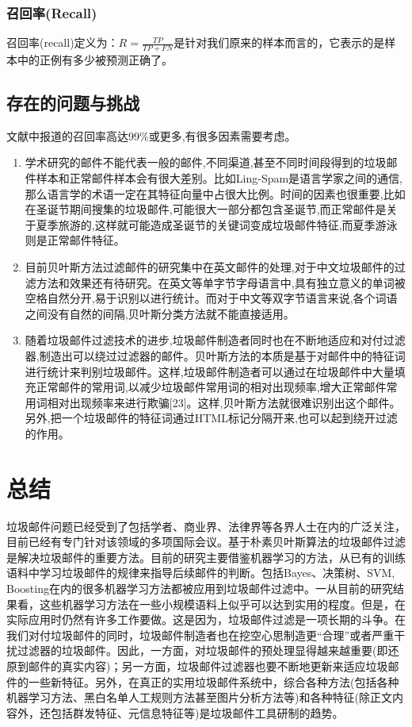 \documentclass[UTF8]{ctexart}
\begin{document}
\subsubsection{召回率(Recall)}
召回率(recall)定义为：$R=\frac{T P}{T P+F N}$是针对我们原来的样本而言的，它表示的是样本中的正例有多少被预测正确了。

\subsection{存在的问题与挑战}
文献中报道的召回率高达99\%或更多,有很多因素需要考虑。
\begin{enumerate}
	\item 学术研究的邮件不能代表一般的邮件,不同渠道,甚至不同时间段得到的垃圾邮件样本和正常邮件样本会有很大差别。比如Ling-Spam是语言学家之间的通信,那么语言学的术语一定在其特征向量中占很大比例。时间的因素也很重要,比如在圣诞节期间搜集的垃圾邮件,可能很大一部分都包含圣诞节,而正常邮件是关于夏季旅游的,这样就可能造成圣诞节的关键词变成垃圾邮件特征,而夏季游泳则是正常邮件特征。
	\item 目前贝叶斯方法过滤邮件的研究集中在英文邮件的处理,对于中文垃圾邮件的过滤方法和效果还有待研究。在英文等单字节字母语言中,具有独立意义的单词被空格自然分开,易于识别以进行统计。而对于中文等双字节语言来说,各个词语之间没有自然的间隔,贝叶斯分类方法就不能直接适用。
	\item 随着垃圾邮件过滤技术的进步,垃圾邮件制造者同时也在不断地适应和对付过滤器,制造出可以绕过过滤器的邮件。贝叶斯方法的本质是基于对邮件中的特征词进行统计来判别垃圾邮件。这样,垃圾邮件制造者可以通过在垃圾邮件中大量填充正常邮件的常用词,以减少垃圾邮件常用词的相对出现频率,增大正常邮件常用词相对出现频率来进行欺骗[23]。这样,贝叶斯方法就很难识别出这个邮件。另外,把一个垃圾邮件的特征词通过HTML标记分隔开来,也可以起到绕开过滤的作用。
\end{enumerate}

\section{总结}
垃圾邮件问题已经受到了包括学者、商业界、法律界等各界人士在内的广泛关注，目前已经有专门针对该领域的多项国际会议。基于朴素贝叶斯算法的垃圾邮件过滤是解决垃圾邮件的重要方法。目前的研究主要借鉴机器学习的方法，从已有的训练语料中学习垃圾邮件的规律来指导后续邮件的判断。包括Bayes、决策树、SVM, Boosting在内的很多机器学习方法都被应用到垃圾邮件过滤中。一从目前的研究结果看，这些机器学习方法在一些小规模语料上似乎可以达到实用的程度。但是，在实际应用时仍然有许多工作要做。这是因为，垃圾邮件过滤是一项长期的斗争。在我们对付垃圾邮件的同时，垃圾邮件制造者也在挖空心思制造更“合理”或者严重干扰过滤器的垃圾邮件。因此，一方面，对垃圾邮件的预处理显得越来越重要(即还原到邮件的真实内容)；另一方面，垃圾邮件过滤器也要不断地更新来适应垃圾邮件的一些新特征。另外，在真正的实用垃圾邮件系统中，综合各种方法(包括各种机器学习方法、黑白名单人工规则方法甚至图片分析方法等)和各种特征(除正文内容外，还包括群发特征、元信息特征等)是垃圾邮件工具研制的趋势。
\end{document}

